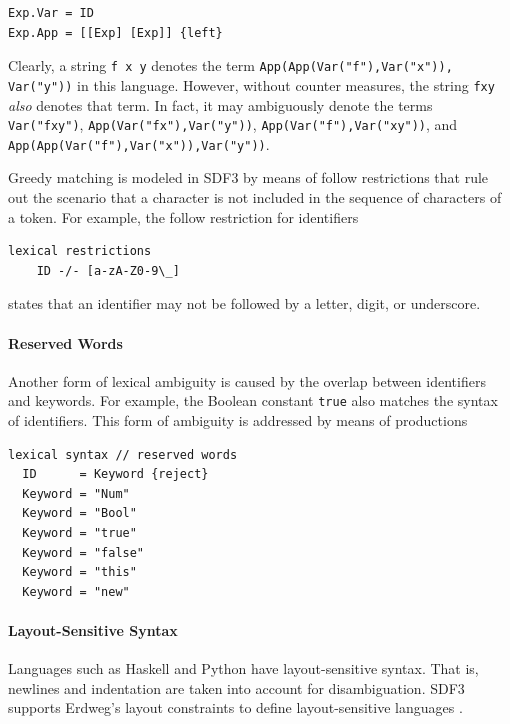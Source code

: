 \begin{lstlisting}[language=SDF]
Exp.Var = ID
Exp.App = [[Exp] [Exp]] {left}
\end{lstlisting}

Clearly, a string \texttt{f x y} denotes the term
\texttt{App(App(Var("f"),Var("x")), Var("y"))} in this language. However,
without counter measures, the string \texttt{fxy} \emph{also} denotes that term.
In fact, it may ambiguously denote the terms
\texttt{Var("fxy")}, 
\texttt{App(Var("fx"),Var("y"))}, 
\texttt{App(Var("f"),Var("xy"))}, and
\texttt{App(App(Var("f"),Var("x")),Var("y"))}.

Greedy matching is modeled in SDF3 by means of follow restrictions that rule out
the scenario that a character is not included in the sequence of characters of a
token. For example, the follow restriction for identifiers

\begin{lstlisting}[language=SDF]
lexical restrictions
	ID -/- [a-zA-Z0-9\_]
\end{lstlisting}

states that an identifier may not be followed by a letter, digit, or underscore.

\paragraph{Reserved Words}

Another form of lexical ambiguity is caused by the overlap between identifiers
and keywords. For example, the Boolean constant \texttt{true} also matches the
syntax of identifiers. This form of ambiguity is addressed by means of
 productions

\begin{lstlisting}[language=SDF]
lexical syntax // reserved words
  ID      = Keyword {reject}
  Keyword = "Num"    
  Keyword = "Bool"   
  Keyword = "true"   
  Keyword = "false"  
  Keyword = "this"  
  Keyword = "new"
\end{lstlisting}


\paragraph{Layout-Sensitive Syntax}

Languages such as Haskell and Python have layout-sensitive syntax. That is,
newlines and indentation are taken into account for disambiguation. SDF3
supports Erdweg's layout constraints to define layout-sensitive languages
\cite{ErdwegRKO12}.


